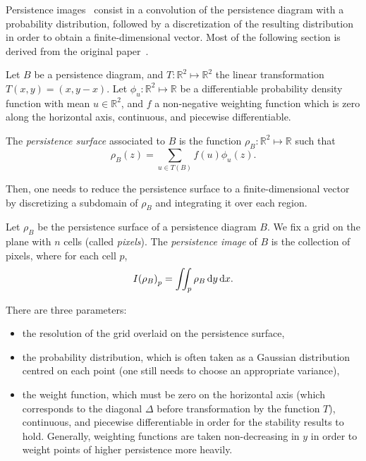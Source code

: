 \documentclass[a4paper,11pt,openany,extrafontsizes]{memoir}
\begin{document}
Persistence images~\cite{adams_persistence_2017} consist in a
convolution of the persistence diagram with a probability
distribution, followed by a discretization of the resulting
distribution in order to obtain a finite-dimensional vector. Most of
the following section is derived from the original
paper~\cite{adams_persistence_2017}.

\begin{defn}
  Let $B$ be a persistence diagram, and
  $T : \mathbb{R}^2\mapsto\mathbb{R}^2$ the linear transformation
  $T(x,y) = (x, y-x)$. Let $\phi_u:\mathbb{R}^2\mapsto\mathbb{R}$ be a
  differentiable probability density function with mean
  $u\in\mathbb{R}^2$, and $f$ a non-negative weighting function which
  is zero along the horizontal axis, continuous, and piecewise
  differentiable.

  The \emph{persistence surface} associated to $B$ is the function
  $\rho_B:\mathbb{R}^2\mapsto\mathbb{R}$ such that
  \[ \rho_B(z) = \sum_{u\in T(B)} f(u) \phi_u(z). \]
\end{defn}

Then, one needs to reduce the persistence surface to a
finite-dimensional vector by discretizing a subdomain of $\rho_B$ and
integrating it over each region.

\begin{defn}
  Let $\rho_B$ be the persistence surface of a persistence diagram
  $B$. We fix a grid on the plane with $n$ cells (called
  \emph{pixels}). The \emph{persistence image} of $B$ is the
  collection of pixels, where for each cell $p$,
  \[ {I(\rho_B)}_p = \iint_p \rho_B \mathop{}\!\mathrm{d} y \mathop{}\!\mathrm{d} x. \]
\end{defn}

There are three parameters:
\begin{itemize}
\item the resolution of the grid overlaid on the persistence surface,
\item the probability distribution, which is often taken as a Gaussian
  distribution centred on each point (one still needs to choose an
  appropriate variance),
\item the weight function, which must be zero on the horizontal axis
  (which corresponds to the diagonal $\Delta$ before transformation by
  the function $T$), continuous, and piecewise differentiable in order
  for the stability results to hold. Generally, weighting functions
  are taken non-decreasing in $y$ in order to weight points of higher
  persistence more heavily.
\end{itemize}
\end{document}

